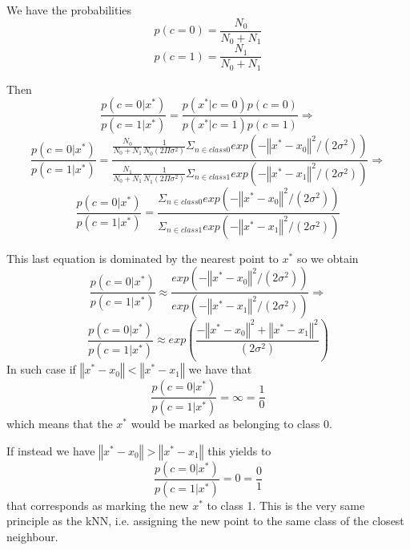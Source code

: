 We have the probabilities
\[ p(c=0) = \frac{N_0}{N_0 + N_1}  \]
\[ p(c=1) = \frac{N_1}{N_0 + N_1}  \]

Then
\[
    \frac{p(c=0 | x^*)}{p(c=1 | x^*)} =
    \frac{p(x^* | c=0) p(c=0)}
         {p(x^* | c=1) p(c=1)} \Rightarrow
\]
\[
    \frac{p(c=0 | x^*)}{p(c=1 | x^*)} =
    \frac{\frac{N_0}{N_0 + N_1} 
            \frac{1}{N_0(2\Pi\sigma^2)} \Sigma_{n\in class0} 
                exp(-\left\Vert x^* - x_0 \right\Vert^2/(2\sigma^2)) }
        {\frac{N_1}{N_0 + N_1} 
            \frac{1}{N_1(2\Pi\sigma^2)} \Sigma_{n\in class1} 
                exp(-\left\Vert x^* - x_1 \right\Vert^2/(2\sigma^2)) } 
       \Rightarrow
\]
\[
    \frac{p(c=0 | x^*)}{p(c=1 | x^*)} =
    \frac{\Sigma_{n\in class0} 
                exp(-\left\Vert x^* - x_0 \right\Vert^2/(2\sigma^2)) }
        {\Sigma_{n\in class1} 
                exp(-\left\Vert x^* - x_1 \right\Vert^2/(2\sigma^2)) } 
\]

This last equation is dominated by the nearest point to $x^*$ so we obtain
\[
    \frac{p(c=0 | x^*)}{p(c=1 | x^*)} \approx 
    \frac{exp(-\left\Vert x^* - x_0 \right\Vert^2/(2\sigma^2))}
         {exp(-\left\Vert x^* - x_1 \right\Vert^2/(2\sigma^2))}
    \Rightarrow
\]
\[
    \frac{p(c=0 | x^*)}{p(c=1 | x^*)} \approx 
    exp\left(\frac{-\left\Vert x^* - x_0 \right\Vert^2 +\left\Vert x^* - x_1 \right\Vert^2} 
            {(2\sigma^2)}\right)
\]
In such case if 
$\left\Vert x^* - x_0 \right\Vert < \left\Vert x^* - x_1\right\Vert$
we have that 
\[
    \frac{p(c=0 | x^*)}{p(c=1 | x^*)} = \infty = \frac{1}{0}
\]
which means that the $x^*$ would be marked as belonging to class 0.

If instead we have
$\left\Vert x^* - x_0 \right\Vert > \left\Vert x^* - x_1\right\Vert$
this yields to
\[
    \frac{p(c=0 | x^*)}{p(c=1 | x^*)} = 0 = \frac{0}{1}
\]
that corresponds as marking the new $x^*$ to class 1.
This is the very same principle as the kNN, i.e. assigning the new point to the
same class of the closest neighbour.
